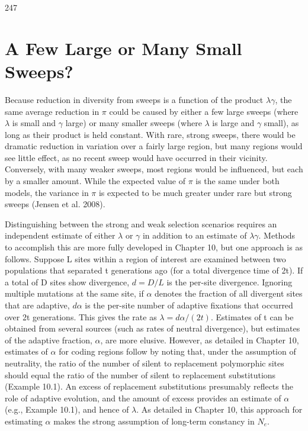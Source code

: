 \documentclass{article}
\begin{document}
247

\section{A Few Large or Many Small Sweeps?}
Because reduction in diversity from sweeps is a function of the product  $ \lambda\gamma $, the same average reduction in  $ \pi $ could be caused by either a few large sweeps (where  $ \lambda $ is small and  $ \gamma $ large) or many smaller sweeps (where  $ \lambda $ is large and  $ \gamma $ small), as long as their product is held constant. With rare, strong sweeps, there would be dramatic reduction in variation over a fairly large region, but many regions would see little effect, as no recent sweep would have occurred in their vicinity. Conversely, with many weaker sweeps, most regions would be influenced, but each by a smaller amount. While the expected value of  $ \pi $ is the same under both models, the variance in  $ \pi $ is expected to be much greater under rare but strong sweeps (Jensen et al. 2008).

Distinguishing between the strong and weak selection scenarios requires an independent estimate of either  $ \lambda $ or  $ \gamma $ in addition to an estimate of  $ \lambda\gamma $. Methods to accomplish this are more fully developed in Chapter 10, but one approach is as follows. Suppose L sites within a region of interest are examined between two populations that separated t generations ago (for a total divergence time of 2t). If a total of D sites show divergence,  $ d = D/L $ is the per-site divergence. Ignoring multiple mutations at the same site, if  $ \alpha $ denotes the fraction of all divergent sites that are adaptive,  $ d\alpha $ is the per-site number of adaptive fixations that occurred over 2t generations. This gives the rate as  $ \lambda = d\alpha/(2t) $. Estimates of t can be obtained from several sources (such as rates of neutral divergence), but estimates of the adaptive fraction,  $ \alpha $, are more elusive. However, as detailed in Chapter 10, estimates of  $ \alpha $ for coding regions follow by noting that, under the assumption of neutrality, the ratio of the number of silent to replacement polymorphic sites should equal the ratio of the number of silent to replacement substitutions (Example 10.1). An excess of replacement substitutions presumably reflects the role of adaptive evolution, and the amount of excess provides an estimate of  $ \alpha $ (e.g., Example 10.1), and hence of  $ \lambda $. As detailed in Chapter 10, this approach for estimating  $ \alpha $ makes the strong assumption of long-term constancy in  $ N_e $.
\end{document}
